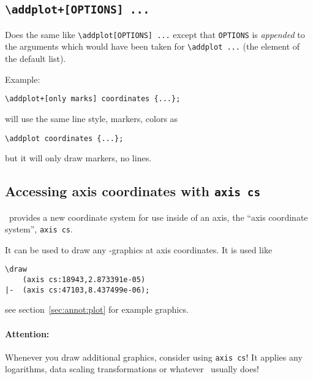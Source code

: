 \subsection{\texttt{\textbackslash addplot+[OPTIONS] ...}}
Does the same like \lstinline!\addplot[OPTIONS] ...! except that \texttt{OPTIONS} is \emph{appended} to the arguments which would have been taken for \lstinline!\addplot ...! (the element of the default list).

Example:
\begin{lstlisting}
\addplot+[only marks] coordinates {...};
\end{lstlisting}
will use the same line style, markers, colors as
\begin{lstlisting}
\addplot coordinates {...};
\end{lstlisting}
but it will only draw markers, no lines.

\subsection{Accessing axis coordinates with \texttt{axis cs}}
\label{sec:axis:coords}%
\PGFPlots\ provides a new coordinate system for use inside of an axis, the ``axis coordinate system'', \texttt{axis cs}.

It can be used to draw any \Tikz-graphics at axis coordinates. It is used like
\begin{lstlisting}
\draw 
	(axis cs:18943,2.873391e-05) 
|-	(axis cs:47103,8.437499e-06);
\end{lstlisting}
see section~\ref{sec:annot:plot} for example graphics.

\paragraph{Attention:} Whenever you draw additional graphics, consider using \texttt{axis cs}! It applies any logarithms, data scaling transformations or whatever \PGFPlots\ usually does!

